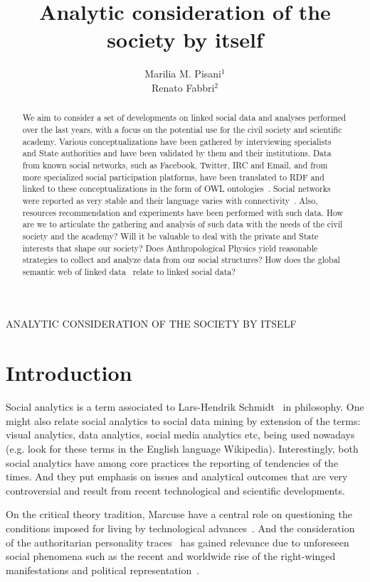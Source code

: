\documentclass[letterpaper,10pt]{article}
\begin{document}
\title{Analytic consideration of the society by itself}
ANALYTIC CONSIDERATION OF THE SOCIETY BY ITSELF

\author{Marilia M. Pisani$^1$\\
Renato Fabbri$^2$}
\address{$^1$CCNH/UFABC, $^2$IFSC/USP}

\begin{abstract}
We aim to consider a set of developments on linked social data
and analyses performed over the last years, with a focus
on the potential use for the civil society and scientific academy.
Various conceptualizations have been gathered by interviewing specialists
and State authorities and have been validated by them and their institutions.
Data from known social networks, such as Facebook, Twitter, IRC and Email,
and from more specialized social participation platforms, have been
	translated to RDF and linked to these conceptualizations in the form of OWL ontologies~\cite{losd,pnud5}.
Social networks were reported as very stable and their language varies
	with connectivity~\cite{tese,stab}.
	Also, resources recommendation and experiments have been performed with such data.
	How are we to articulate the gathering and analysis 
	of such data with the needs of the civil society and the academy?
	Will it be valuable to deal with the private and State interests
	that shape our society?
	Does Anthropological Physics yield reasonable strategies
	to collect and analyze data from our social structures?
	How does the global semantic web of linked data~\cite{losd}
	relate to linked social data?
\end{abstract}

\section{Introduction}
Social analytics is a term associated to Lars-Hendrik Schmidt~\cite{wSA}
in philosophy.
One might also relate social analytics to social data mining
by extension of the terms: visual analytics, data analytics, social media analytics etc,
being used nowadays (e.g. look for these terms in the English language Wikipedia).
Interestingly, both social analytics 
have among core practices the reporting of tendencies of the times.
And they put emphasis on issues and analytical outcomes
that are very controversial and result from recent technological and scientific developments.

On the critical theory tradition,
Marcuse have a central role on
questioning the conditions
imposed for living by technological advances~\cite{m1,m2,m3,m4}.
And the consideration of the authoritarian personality traces~\cite{au}
has gained relevance due to unforeseen social phenomena
such as the recent and worldwide rise of the right-winged manifestations
and political representation~\cite{rise,rise2}.
\end{document}
